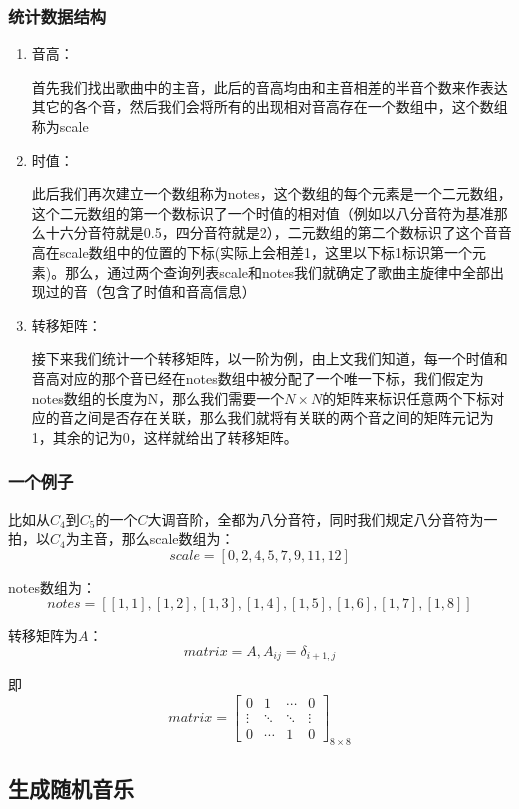 \documentclass[12pt, a4paper, oneside]{ctexart}
\begin{document}
	\subsubsection{统计数据结构}
	\begin{enumerate}
		\item 音高：
		
		首先我们找出歌曲中的主音，此后的音高均由和主音相差的半音个数来作表达其它的各个音，然后我们会将所有的出现相对音高存在一个数组中，这个数组称为scale
		\item 时值：
		
		此后我们再次建立一个数组称为notes，这个数组的每个元素是一个二元数组，这个二元数组的第一个数标识了一个时值的相对值（例如以八分音符为基准那么十六分音符就是0.5，四分音符就是2），二元数组的第二个数标识了这个音音高在scale数组中的位置的下标(实际上会相差1，这里以下标1标识第一个元素)。那么，通过两个查询列表scale和notes我们就确定了歌曲主旋律中全部出现过的音（包含了时值和音高信息）
		\item 转移矩阵：
		
		接下来我们统计一个转移矩阵，以一阶为例，由上文我们知道，每一个时值和音高对应的那个音已经在notes数组中被分配了一个唯一下标，我们假定为notes数组的长度为N，那么我们需要一个$N\times N$的矩阵来标识任意两个下标对应的音之间是否存在关联，那么我们就将有关联的两个音之间的矩阵元记为1，其余的记为0，这样就给出了转移矩阵。
	\end{enumerate}
	
	\subsubsection{一个例子}
	比如从$C_4$到$C_5$的一个$C$大调音阶，全都为八分音符，同时我们规定八分音符为一拍，以$C_4$为主音，那么scale数组为：
	$$scale = [0, 2, 4, 5, 7, 9, 11, 12]$$
	
	notes数组为：
	$$notes = [[1,1], [1,2], [1,3], [1,4], [1,5],[1,6],[1,7],[1,8]]$$
	
	转移矩阵为$A$：
	$$matrix = A, A_{ij} = \delta_{i+1, j}$$
	
	即
	$$matrix = \begin{bmatrix}
		0 & 1 & \cdots & 0\\
		\vdots &\ddots &\ddots &\vdots\\
		0& \cdots & 1 &0
	\end{bmatrix}_{8\times 8}$$
    
    \subsection{生成随机音乐}
\end{document}
